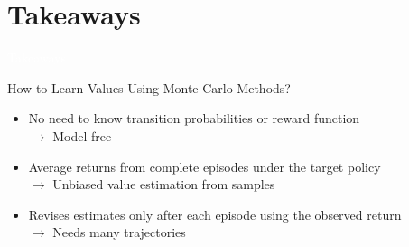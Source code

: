 \documentclass[11pt,table]{beamer}
\begin{document}
\section{Takeaways}
{
\begin{frame}
\centering
\Huge
\textcolor{white}{Takeaways}
\thispagestyle{empty}
\end{frame}
}



\begin{frame}{How to Learn Values Using Monte Carlo Methods?}
  \begin{itemize}
    \item No need to know transition probabilities or reward function\\$\rightarrow$ Model free\\[2ex]
    \item Average returns from complete episodes under the target policy\\$\rightarrow$ Unbiased value estimation from samples\\[2ex]
    \item Revises estimates only after each episode using the observed return\\$\rightarrow$ Needs many trajectories
  \end{itemize}
\end{frame}
\end{document}
